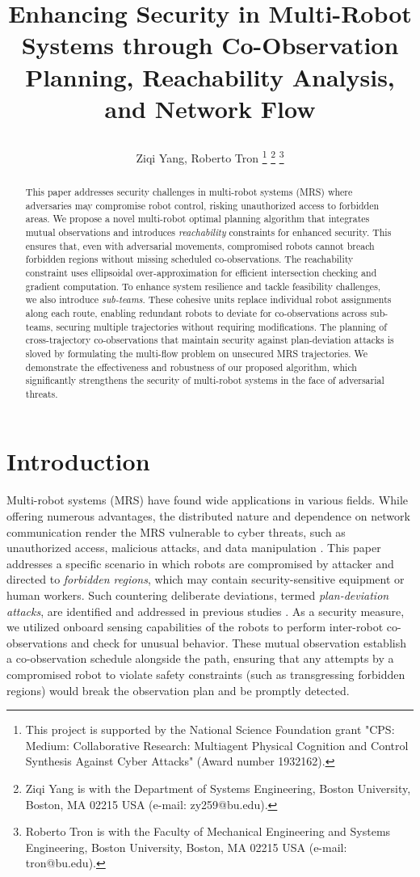 \documentclass[10pt,twocolumn,twoside]{IEEEtran}
\title{\LARGE \bf

Enhancing Security in Multi-Robot Systems through Co-Observation Planning, Reachability Analysis, and Network Flow}
\author{Ziqi Yang, Roberto Tron \IEEEmembership{Member, IEEE} 
\thanks{This project is supported by the National Science Foundation grant "CPS: Medium: Collaborative Research: Multiagent Physical Cognition and Control Synthesis Against Cyber Attacks" (Award number 1932162).}
\thanks{Ziqi Yang is with the Department of Systems Engineering,
Boston University, Boston, MA 02215 USA (e-mail: zy259@bu.edu).
}
\thanks{Roberto Tron is with the Faculty of Mechanical Engineering and Systems Engineering, Boston University, Boston, MA 02215 USA (e-mail:
tron@bu.edu).}}
\begin{document}
\maketitle
\thispagestyle{empty}
\pagestyle{empty}




\begin{abstract}
This paper addresses security challenges in multi-robot systems (MRS) where adversaries may compromise robot control, risking unauthorized access to forbidden areas. We propose a novel multi-robot optimal planning algorithm that integrates mutual observations and introduces \emph{reachability} constraints for enhanced security. This ensures that, even with adversarial movements, compromised robots cannot breach forbidden regions without missing scheduled co-observations. The reachability constraint uses ellipsoidal over-approximation for efficient intersection checking and gradient computation. To enhance system resilience and tackle feasibility challenges, we also introduce \emph{sub-teams}. These cohesive units replace individual robot assignments along each route, enabling redundant robots to deviate for co-observations across sub-teams, securing multiple trajectories without requiring modifications. The planning of cross-trajectory co-observations that maintain security against plan-deviation attacks is sloved by formulating the multi-flow problem on unsecured MRS trajectories. We demonstrate the effectiveness and robustness of our proposed algorithm, which significantly strengthens the security of multi-robot systems in the face of adversarial threats.
\end{abstract}


\section{Introduction}\label{sec:introduction}
Multi-robot systems (MRS) have found wide applications in various fields. While offering numerous advantages, the distributed nature and dependence on network communication render the MRS vulnerable to cyber threats, such as unauthorized access, malicious attacks, and data manipulation \cite{brunner2010infiltrating}. This paper addresses a specific scenario in which  robots are compromised by attacker and directed to \emph{forbidden regions}, which may contain security-sensitive equipment or human workers. Such countering deliberate deviations, termed \emph{plan-deviation attacks}, are identified and addressed in previous studies \cite{wardega2019resilience, wardega2023byzantine, wardega2023hola, yang2021multi, yang2020multi}. As a security measure, we utilized onboard sensing capabilities of the robots to perform inter-robot co-observations and check for unusual behavior. These mutual observation establish a co-observation schedule alongside the path, ensuring that any attempts by a compromised robot to violate safety constraints (such as transgressing forbidden regions) would break the observation plan and be promptly detected.
\end{document}
